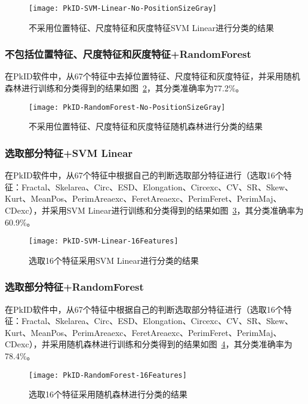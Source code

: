\begin{figure}[!ht]
\centering
\texttt{[image: PkID-SVM-Linear-No-PositionSizeGray]}
\caption{不采用位置特征、尺度特征和灰度特征SVM Linear进行分类的结果}
\label{fig:PkID-SVM-Linear-No-PositionSizeGray}
\end{figure}

\subsubsection{不包括位置特征、尺度特征和灰度特征+RandomForest}
在PkID软件中，从67个特征中去掉位置特征、尺度特征和灰度特征，并采用随机森林进行训练和分类得到的结果如图~\ref{fig:PkID-RandomForest-No-PositionSizeGray}，其分类准确率为77.2\%。

\begin{figure}[!ht]
\centering
\texttt{[image: PkID-RandomForest-No-PositionSizeGray]}
\caption{不采用位置特征、尺度特征和灰度特征随机森林进行分类的结果}
\label{fig:PkID-RandomForest-No-PositionSizeGray}
\end{figure}

\subsubsection{选取部分特征+SVM Linear}
在PkID软件中，从67个特征中根据自己的判断选取部分特征进行（选取16个特征：Fractal、Skelarea、Circ、ESD、Elongation、Circexc、CV、SR、Skew、Kurt、MeanPos、PerimAreaexc、FeretAreaexc、PerimFeret、PerimMaj、CDexc），并采用SVM Linear进行训练和分类得到的结果如图~\ref{fig:PkID-SVM-Linear-16Features}，其分类准确率为60.9\%。

\begin{figure}[!ht]
\centering
\texttt{[image: PkID-SVM-Linear-16Features]}
\caption{选取16个特征采用SVM Linear进行分类的结果}
\label{fig:PkID-SVM-Linear-16Features}
\end{figure}

\subsubsection{选取部分特征+RandomForest}
在PkID软件中，从67个特征中根据自己的判断选取部分特征进行（选取16个特征：Fractal、Skelarea、Circ、ESD、Elongation、Circexc、CV、SR、Skew、Kurt、MeanPos、PerimAreaexc、FeretAreaexc、PerimFeret、PerimMaj、CDexc），并采用随机森林进行训练和分类得到的结果如图~\ref{fig:PkID-RandomForest-16Features}，其分类准确率为78.4\%。

\begin{figure}[!ht]
\centering
\texttt{[image: PkID-RandomForest-16Features]}
\caption{选取16个特征采用随机森林进行分类的结果}
\label{fig:PkID-RandomForest-16Features}
\end{figure}


